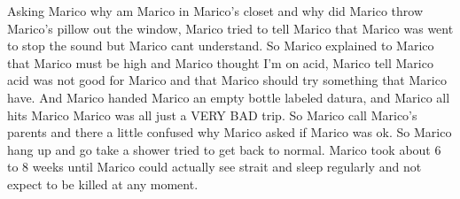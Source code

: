 \documentclass[12pt]{book}
\begin{document}
Asking Marico why am Marico in Marico's closet and why did Marico throw Marico's pillow out the window, Marico tried to tell Marico that Marico was went to stop the sound but Marico cant understand. So Marico explained to Marico that Marico must be high and Marico thought I'm on acid, Marico tell Marico acid was not good for Marico and that Marico should try something that Marico have. And Marico handed Marico an empty bottle labeled datura, and Marico all hits Marico Marico was all just a VERY BAD trip. So Marico call Marico's parents and there a little confused why Marico asked if Marico was ok. So Marico hang up and go take a shower tried to get back to normal. Marico took about 6 to 8 weeks until Marico could actually see strait and sleep regularly and not expect to be killed at any moment.
\end{document}
